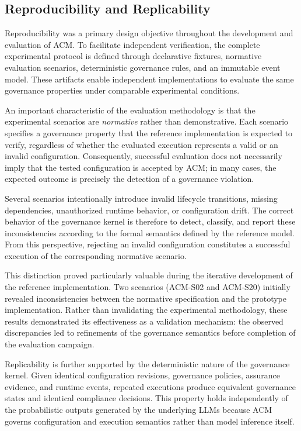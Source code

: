 \documentclass[10pt]{article}
\begin{document}
\subsection{Reproducibility and Replicability}
\label{subsec:reproducibility}

Reproducibility was a primary design objective throughout the development and
evaluation of ACM. To facilitate independent verification, the complete
experimental protocol is defined through declarative fixtures, normative
evaluation scenarios, deterministic governance rules, and an immutable event
model. These artifacts enable independent implementations to evaluate the same
governance properties under comparable experimental conditions.

An important characteristic of the evaluation methodology is that the
experimental scenarios are \emph{normative} rather than demonstrative. Each
scenario specifies a governance property that the reference implementation is
expected to verify, regardless of whether the evaluated execution represents a
valid or an invalid configuration. Consequently, successful evaluation does not
necessarily imply that the tested configuration is accepted by ACM; in many
cases, the expected outcome is precisely the detection of a governance
violation.

Several scenarios intentionally introduce invalid lifecycle transitions,
missing dependencies, unauthorized runtime behavior, or configuration drift.
The correct behavior of the governance kernel is therefore to detect, classify,
and report these inconsistencies according to the formal semantics defined by
the reference model. From this perspective, rejecting an invalid configuration
constitutes a successful execution of the corresponding normative scenario.

This distinction proved particularly valuable during the iterative development
of the reference implementation. Two scenarios (ACM-S02 and ACM-S20) initially
revealed inconsistencies between the normative specification and the prototype
implementation. Rather than invalidating the experimental methodology, these
results demonstrated its effectiveness as a validation mechanism: the observed
discrepancies led to refinements of the governance semantics before completion
of the evaluation campaign.

Replicability is further supported by the deterministic nature of the
governance kernel. Given identical configuration revisions, governance
policies, assurance evidence, and runtime events, repeated executions produce
equivalent governance states and identical compliance decisions. This property
holds independently of the probabilistic outputs generated by the underlying
LLMs because ACM governs configuration and execution semantics rather than
model inference itself.
\end{document}
